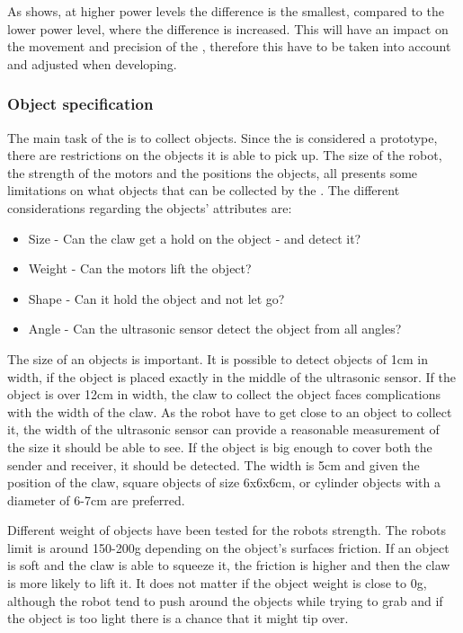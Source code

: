 As  shows, at higher power levels the difference is the smallest, compared to the lower power level, where the difference is increased. This will have an impact on the movement and precision of the \projname{}, therefore this have to be taken into account and adjusted when developing. 

\subsubsection{Object specification} \label{sec:object_specification}
The main task of the \projname{} is to collect objects. Since the \projname{} is considered a prototype, there are restrictions on the objects it is able to pick up. The size of the robot, the strength of the motors and the positions the objects, all presents some limitations on what objects that can be collected by the \projname{}. The different considerations regarding the objects' attributes are:

\begin{itemize}
\item Size - Can the claw get a hold on the object - and detect it? %
\item Weight - Can the motors lift the object? %
\item Shape - Can it hold the object and not let go? %
\item Angle - Can the ultrasonic sensor detect the object from all angles? %
\end{itemize}

The size of an objects is important. It is possible to detect objects of 1cm in width, if the object is placed exactly in the middle of the ultrasonic sensor. If the object is over 12cm in width, the claw to collect the object faces complications with the width of the claw. As the robot have to get close to an object to collect it, the width of the ultrasonic sensor can provide a reasonable measurement of the size it should be able to see. If the object is big enough to cover both the sender and receiver, it should be detected. The width is 5cm and given the position of the claw, square objects of size 6x6x6cm, or cylinder objects with a diameter of 6-7cm are preferred.

Different weight of objects have been tested for the robots strength. The robots limit is around 150-200g depending on the object's surfaces friction. If an object is soft and the claw is able to squeeze it, the friction is higher and then the claw is more likely to lift it. It does not matter if the object weight is close to 0g, although the robot tend to push around the objects while trying to grab and if the object is too light there is a chance that it might tip over.

